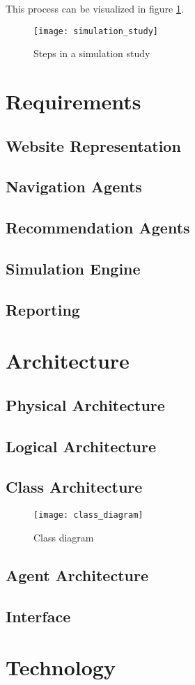 This process can be visualized in figure \ref{fig:sim}.

\begin{figure}[h]
    \begin{center}
        \leavevmode
        \texttt{[image: simulation\_study]}
        \caption{Steps in a simulation study \cite{Banks2004}}
        \label{fig:sim}
    \end{center}
\end{figure}

\section{Requirements}

\subsection{Website Representation}
\subsection{Navigation Agents}
\subsection{Recommendation Agents}
\subsection{Simulation Engine}
\subsection{Reporting}

\section{Architecture}

\subsection{Physical Architecture}
\subsection{Logical Architecture}
\subsection{Class Architecture}

\begin{figure}[h]
    \begin{center}
        \leavevmode
        \texttt{[image: class\_diagram]}
        \caption{Class diagram}
        \label{fig:class}
    \end{center}
\end{figure}

\subsection{Agent Architecture}
\subsection{Interface}

\section{Technology}
